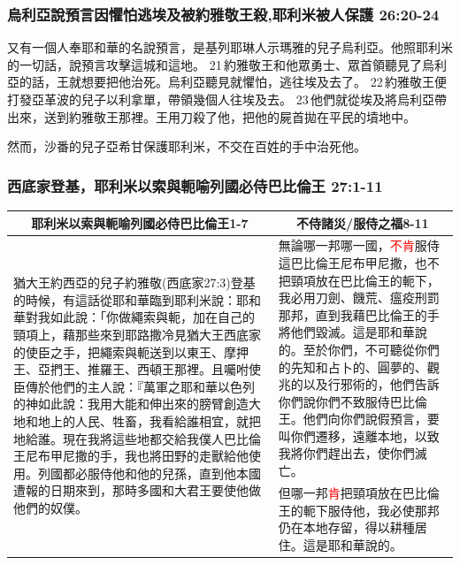 

\subsubsection{烏利亞說預言因懼怕逃埃及被約雅敬王殺,耶利米被人保護 26:20-24}
又有一個人奉耶和華的名說預言，是基列耶琳人示瑪雅的兒子烏利亞。他照耶利米的一切話，說預言攻擊這城和這地。 21 約雅敬王和他眾勇士、眾首領聽見了烏利亞的話，王就想要把他治死。烏利亞聽見就懼怕，逃往埃及去了。 22 約雅敬王便打發亞革波的兒子以利拿單，帶領幾個人往埃及去。 23 他們就從埃及將烏利亞帶出來，送到約雅敬王那裡。王用刀殺了他，把他的屍首拋在平民的墳地中。

然而，沙番的兒子亞希甘保護耶利米，不交在百姓的手中治死他。

\subsubsection{西底家登基，耶利米以索與軛喻列國必侍巴比倫王 27:1-11}
\begin{table}[H]
\centering
\begin{tabular}{p{9cm}|p{7.50cm}}\hline\hline
\multicolumn{1}{c|}{耶利米以索與軛喻列國必侍巴比倫王1-7}&\multicolumn{1}{c}{不侍諸災/服侍之福8-11}\\\hline
\multirow{2}{9.2cm}{猶大王約西亞的兒子約雅敬(西底家27:3)登基的時候，有這話從耶和華臨到耶利米說：耶和華對我如此說：「你做繩索與軛，加在自己的頸項上，藉那些來到耶路撒冷見猶大王西底家的使臣之手，把繩索與軛送到以東王、摩押王、亞捫王、推羅王、西頓王那裡。且囑咐使臣傳於他們的主人說：『萬軍之耶和華以色列的神如此說：我用大能和伸出來的膀臂創造大地和地上的人民、牲畜，我看給誰相宜，就把地給誰。現在我將這些地都交給我僕人巴比倫王尼布甲尼撒的手，我也將田野的走獸給他使用。列國都必服侍他和他的兒孫，直到他本國遭報的日期來到，那時多國和大君王要使他做他們的奴僕。}
&無論哪一邦哪一國，\textcolor{red}{不肯}服侍這巴比倫王尼布甲尼撒，也不把頸項放在巴比倫王的軛下，我必用刀劍、饑荒、瘟疫刑罰那邦，直到我藉巴比倫王的手將他們毀滅。這是耶和華說的。至於你們，不可聽從你們的先知和占卜的、圓夢的、觀兆的以及行邪術的，他們告訴你們說你們不致服侍巴比倫王。他們向你們說假預言，要叫你們遷移，遠離本地，以致我將你們趕出去，使你們滅亡。\\\cline{2-2}
&但哪一邦\textcolor{red}{肯}把頸項放在巴比倫王的軛下服侍他，我必使那邦仍在本地存留，得以耕種居住。這是耶和華說的。\\\hline
\end{tabular}
\end{table}



